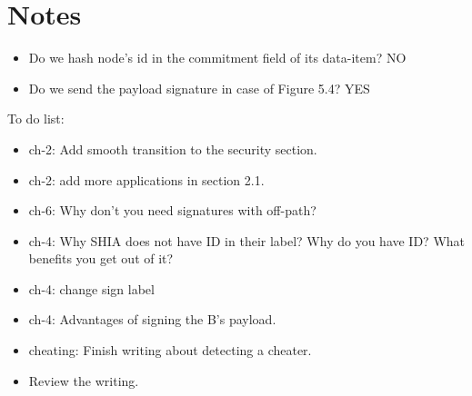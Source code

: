 \chapter{Notes}

\begin{itemize}
	\item Do we hash node's id in the commitment field of its data-item? NO
	\item Do we send the payload signature in case of Figure 5.4? YES
\end{itemize}

To do list:
\begin{itemize}
	\item ch-2: Add smooth transition to the security section.
	\item ch-2: add more applications in section 2.1.
	\item ch-6: Why don't you need signatures with off-path?
	\item ch-4: Why SHIA does not have ID in their label? Why do you have ID? What benefits you get out of it?
	\item ch-4: change sign label
	\item ch-4: Advantages of signing the B's payload.
	\item cheating: Finish writing about detecting a cheater.
	\item Review the writing.
	
\end{itemize}